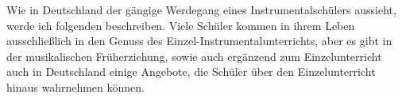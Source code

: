 
Wie in Deutschland der gängige Werdegang eines Instrumentalschülers aussieht,
werde ich folgenden beschreiben. Viele Schüler kommen in ihrem Leben
ausschließlich in den Genuss des Einzel-Instrumentalunterrichts, aber es gibt in
der musikalischen Früherziehung, sowie auch ergänzend zum Einzelunterricht auch
in Deutschland einige Angebote, die Schüler über den Einzelunterricht hinaus
wahrnehmen können.





